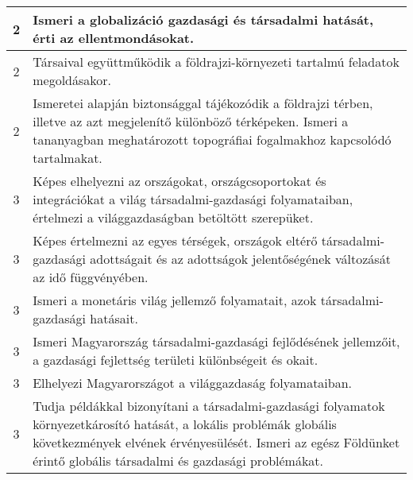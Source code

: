 \begin{longtable}{c | p{12cm} }
                                
                                          2 &  Ismeri a globalizáció gazdasági és társadalmi hatását, érti az ellentmondásokat. \\ \hline
                                          2 &  Társaival együttműködik a földrajzi-környezeti tartalmú feladatok megoldásakor. \\ \hline
                                          2 &  Ismeretei alapján biztonsággal tájékozódik a földrajzi térben, illetve az azt megjelenítő különböző térképeken. Ismeri a tananyagban meghatározott topográfiai fogalmakhoz kapcsolódó tartalmakat. \\ \hline
                                      
                                
                                          3 &  Képes elhelyezni az országokat, országcsoportokat és integrációkat a világ társadalmi-gazdasági folyamataiban, értelmezi a világgazdaságban betöltött szerepüket. \\ \hline
                                          3 &  Képes értelmezni az egyes térségek, országok eltérő társadalmi-gazdasági adottságait és az adottságok jelentőségének változását az idő függvényében. \\ \hline
                                          3 &  Ismeri a monetáris világ jellemző folyamatait, azok társadalmi-gazdasági hatásait. \\ \hline
                                          3 &  Ismeri Magyarország társadalmi-gazdasági fejlődésének jellemzőit, a gazdasági fejlettség területi különbségeit és okait. \\ \hline
                                          3 &  Elhelyezi Magyarországot a világgazdaság folyamataiban. \\ \hline
                                          3 &  Tudja példákkal bizonyítani a társadalmi-gazdasági folyamatok környezetkárosító hatását, a lokális problémák globális következmények elvének érvényesülését. Ismeri az egész Földünket érintő globális társadalmi és gazdasági problémákat. \\ \hline
                                      

\end{longtable}
